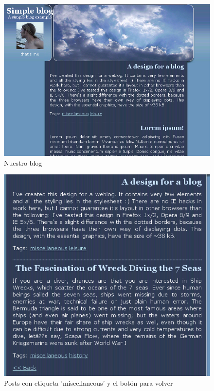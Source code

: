 
\begin{figure}
	\centering
	\includegraphics[scale=0.8]{images/blog1.png}
 	\caption{Nuestro blog}
 	\label{fig-blog1}
\end{figure}

\begin{figure}
	\centering
	\includegraphics{images/blog2.png}
 	\caption{Posts con etiqueta 'miscellaneous' y el botón para volver}
 	\label{fig-blog2}
\end{figure}

